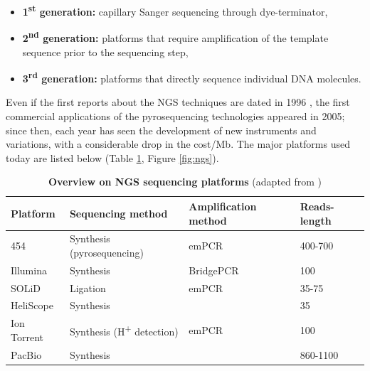 \begin{itemize}
\item \textbf{1\textsuperscript{st} generation:} capillary Sanger sequencing through dye-terminator,
\item \textbf{2\textsuperscript{nd} generation:} platforms that require amplification of the template sequence prior to the sequencing step,
\item \textbf{3\textsuperscript{rd} generation:} platforms that directly sequence individual DNA molecules.
\end{itemize}

Even if the first reports about the NGS techniques are dated in 1996 \cite{ronaghi1996real}, the first commercial applications of the pyrosequencing technologies appeared in 2005; since then, each year has seen the development of new instruments and variations, with a considerable drop in the cost/Mb. The major platforms used today are listed below (Table \ref{tab:ngs}, Figure \ref{fig:ngs}).

\begin{table}
    \begin{tabularx}{\textwidth}{|p{2cm}|p{5.3cm}|p{2.8cm}|p{1.2cm}|}
        \hline
        Platform    & Sequencing method          & Amplification method & Reads-length \\ \hline
        454         & Synthesis (pyrosequencing) & emPCR                & 400-700      \\ 
        Illumina    & Synthesis                  & BridgePCR            & 100          \\ 
        SOLiD       & Ligation                   & emPCR                & 35-75        \\ 
        HeliScope   & Synthesis                  & ~                    & 35           \\ 
        Ion Torrent & Synthesis (H\textsuperscript{+} detection)   & emPCR                & 100         \\ 
        PacBio      & Synthesis                  & ~                    & 860-1100     \\
        \hline
    \end{tabularx}
    \caption{\label{tab:ngs}\textbf{Overview on NGS sequencing platforms} (adapted from \cite{glenn2011field})}
\end{table}

